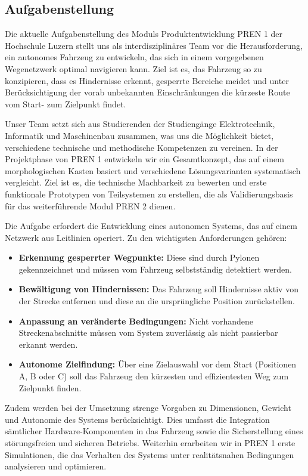 \documentclass[main.tex]{subfiles} %
\begin{document}

\subsection{Aufgabenstellung}

Die aktuelle Aufgabenstellung des Moduls Produktentwicklung PREN 1 der
Hochschule Luzern stellt uns als interdisziplinäres Team vor die
Herausforderung, ein autonomes Fahrzeug zu entwickeln, das sich in einem
vorgegebenen Wegenetzwerk optimal navigieren kann. Ziel ist es, das Fahrzeug so
zu konzipieren, dass es Hindernisse erkennt, gesperrte Bereiche meidet und
unter Berücksichtigung der vorab unbekannten Einschränkungen die kürzeste Route
vom Start- zum Zielpunkt findet.

Unser Team setzt sich aus Studierenden der Studiengänge Elektrotechnik,
Informatik und Maschinenbau zusammen, was uns die Möglichkeit bietet,
verschiedene technische und methodische Kompetenzen zu vereinen. In der
Projektphase von PREN 1 entwickeln wir ein Gesamtkonzept, das auf einem
morphologischen Kasten basiert und verschiedene Lösungsvarianten systematisch
vergleicht. Ziel ist es, die technische Machbarkeit zu bewerten und erste
funktionale Prototypen von Teilsystemen zu erstellen, die als Validierungsbasis
für das weiterführende Modul PREN 2 dienen.

Die Aufgabe erfordert die Entwicklung eines autonomen Systems, das auf einem
Netzwerk aus Leitlinien operiert. Zu den wichtigsten Anforderungen gehören:
\begin{itemize}
    \item \textbf{Erkennung gesperrter Wegpunkte:} Diese sind durch Pylonen gekennzeichnet und müssen vom Fahrzeug selbstständig detektiert werden.
    \item \textbf{Bewältigung von Hindernissen:} Das Fahrzeug soll Hindernisse aktiv von der Strecke entfernen und diese an die ursprüngliche Position zurückstellen.
    \item \textbf{Anpassung an veränderte Bedingungen:} Nicht vorhandene Streckenabschnitte müssen vom System zuverlässig als nicht passierbar erkannt werden.
    \item \textbf{Autonome Zielfindung:} Über eine Zielauswahl vor dem Start (Positionen A, B oder C) soll das Fahrzeug den kürzesten und effizientesten Weg zum Zielpunkt finden.
\end{itemize}

Zudem werden bei der Umsetzung strenge Vorgaben zu Dimensionen, Gewicht und
Autonomie des Systems berücksichtigt. Dies umfasst die Integration sämtlicher
Hardware-Komponenten in das Fahrzeug sowie die Sicherstellung eines
störungsfreien und sicheren Betriebs. Weiterhin erarbeiten wir in PREN 1 erste
Simulationen, die das Verhalten des Systems unter realitätsnahen Bedingungen
analysieren und optimieren.
\end{document}
